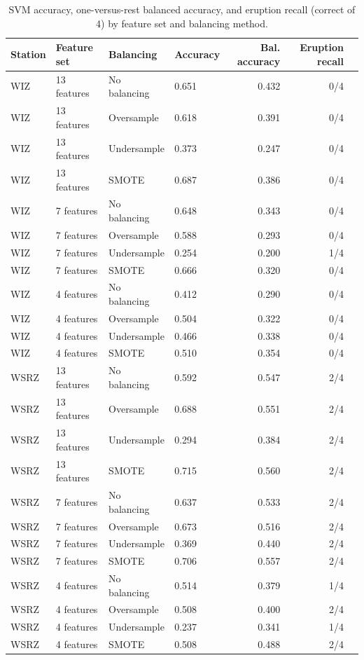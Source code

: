 \documentclass[11pt,a4paper]{article}
\begin{document}
\begin{table}[H]
	\centering\small
	\setlength{\tabcolsep}{4pt}
	\caption{SVM accuracy, one-versus-rest balanced accuracy, and eruption recall (correct of 4) by feature set and balancing method.}\label{tab:svm_comparison}
	\begin{tabularx}{\linewidth}{Ylllrrr}
		\toprule
		Station & Feature set & Balancing & Accuracy & Bal. accuracy & Eruption recall\\
		\midrule
		WIZ & 13 features & No balancing & 0.651 & 0.432 & 0/4\\
		WIZ & 13 features & Oversample & 0.618 & 0.391 & 0/4\\
		WIZ & 13 features & Undersample & 0.373 & 0.247 & 0/4\\
		WIZ & 13 features & SMOTE & 0.687 & 0.386 & 0/4\\
		WIZ & 7 features & No balancing & 0.648 & 0.343 & 0/4\\
		WIZ & 7 features & Oversample & 0.588 & 0.293 & 0/4\\
		WIZ & 7 features & Undersample & 0.254 & 0.200 & 1/4\\
		WIZ & 7 features & SMOTE & 0.666 & 0.320 & 0/4\\
		WIZ & 4 features & No balancing & 0.412 & 0.290 & 0/4\\
		WIZ & 4 features & Oversample & 0.504 & 0.322 & 0/4\\
		WIZ & 4 features & Undersample & 0.466 & 0.338 & 0/4\\
		WIZ & 4 features & SMOTE & 0.510 & 0.354 & 0/4\\
		\addlinespace[2pt]
		WSRZ & 13 features & No balancing & 0.592 & 0.547 & 2/4\\
		WSRZ & 13 features & Oversample & 0.688 & 0.551 & 2/4\\
		WSRZ & 13 features & Undersample & 0.294 & 0.384 & 2/4\\
		WSRZ & 13 features & SMOTE & 0.715 & 0.560 & 2/4\\
		WSRZ & 7 features & No balancing & 0.637 & 0.533 & 2/4\\
		WSRZ & 7 features & Oversample & 0.673 & 0.516 & 2/4\\
		WSRZ & 7 features & Undersample & 0.369 & 0.440 & 2/4\\
		WSRZ & 7 features & SMOTE & 0.706 & 0.557 & 2/4\\
		WSRZ & 4 features & No balancing & 0.514 & 0.379 & 1/4\\
		WSRZ & 4 features & Oversample & 0.508 & 0.400 & 2/4\\
		WSRZ & 4 features & Undersample & 0.237 & 0.341 & 1/4\\
		WSRZ & 4 features & SMOTE & 0.508 & 0.488 & 2/4\\
		\bottomrule
	\end{tabularx}
\end{table}
\end{document}
